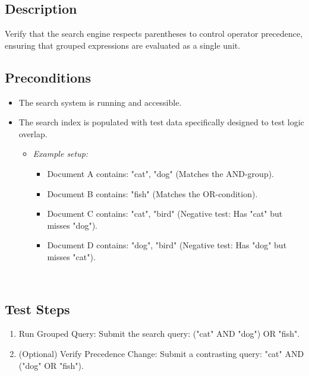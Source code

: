 \documentclass{article}
\begin{document}
\subsection*{Description}
Verify that the search engine respects parentheses to control operator precedence, 
ensuring that grouped \newline expressions are evaluated as a single unit.

\subsection*{Preconditions}
\begin{itemize} 
  \item The search system is running and accessible. 
  \item The search index is populated with test data specifically designed to test logic overlap. 
  
  \begin{itemize} 
    \item[] \textit{Example setup:}  \begin{itemize} 
    \item Document A contains: "cat", "dog" (Matches the AND-group). 
    \item Document B contains: "fish" (Matches the OR-condition). 
    \item Document C contains: "cat", "bird" (Negative test: Has "cat" but misses "dog"). 
    \item Document D contains: "dog", "bird" (Negative test: Has "dog" but misses "cat"). 
  \end{itemize}   \end{itemize} 
\end{itemize}

\subsection*{Test Steps}
\begin{enumerate}
  \item Run Grouped Query: Submit the search query: ("cat" AND "dog") OR "fish". 
  \item (Optional) Verify Precedence Change: Submit a contrasting query: "cat" AND ("dog" OR "fish").
 \end{enumerate}
\end{document}
